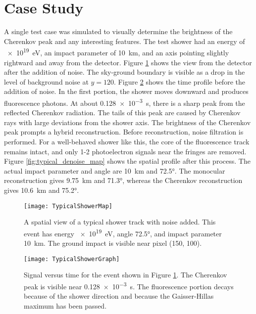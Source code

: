 \section{Case Study}

A single test case was simulated to visually determine the brightness of the Cherenkov peak and any interesting features. The test shower had an energy of \SI{e19}{eV}, an impact parameter of \SI{10}{km}, and an axis pointing slightly rightward and away from the detector. Figure \ref{fig:typical_map} shows the view from the detector after the addition of noise. The sky-ground boundary is visible as a drop in the level of background noise at $y = 120$. Figure \ref{fig:typical_graph} shows the time profile before the addition of noise. In the first portion, the shower moves downward and produces fluorescence photons. At about \SI{0.128e-3}{s}, there is a sharp peak from the reflected Cherenkov radiation. The tails of this peak are caused by Cherenkov rays with large deviations from the shower axis. The brightness of the Cherenkov peak prompts a hybrid reconstruction. Before reconstruction, noise filtration is performed. For a well-behaved shower like this, the core of the fluorescence track remains intact, and only 1-2 photoelectron signals near the fringes are removed. Figure \ref{fig:typical_denoise_map} shows the spatial profile after this process. The actual impact parameter and angle are \SI{10}{km} and \ang{72.5}. The monocular reconstruction gives \SI{9.75}{km} and \ang{71.3}, whereas the Cherenkov reconstruction gives \SI{10.6}{km} and \ang{75.2}.

\begin{figure}[!ht]
    \label{fig:typical_map}
    \centering
    \texttt{[image: TypicalShowerMap]}
    \caption{A spatial view of a typical shower track with noise added. This event has energy \SI{e19}{eV}, angle \ang{72.5}, and impact parameter \SI{10}{km}.  The ground impact is visible near pixel (150, 100).}
\end{figure}

\begin{figure}[!ht]
    \label{fig:typical_graph}
    \centering
    \texttt{[image: TypicalShowerGraph]}
    \caption{Signal versus time for the event shown in Figure \ref{fig:typical_map}. The Cherenkov peak is visible near \SI{0.128e-3}{s}. The fluorescence portion decays because of the shower direction and because the Gaisser-Hillas maximum has been passed.}
\end{figure}


